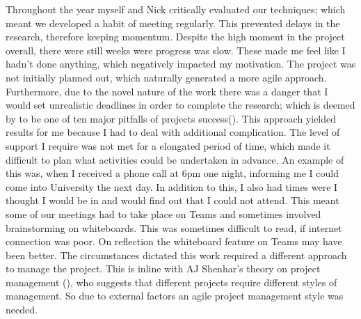 
Throughout the year myself and Nick critically evaluated our techniques; which meant we developed a habit of meeting regularly. This prevented delays in the research, therefore keeping momentum. Despite the high moment in the project overall, there were still weeks were progress was slow. These made me feel like I hadn't done anything, which negatively impacted my motivation. The project was not initially planned out, which naturally generated a more agile approach. Furthermore, due to the novel nature of the work there was a danger that I would set unrealistic deadlines in order to complete the research; which is deemed by \citeauthor{GanttPRO} to be one of ten major pitfalls of projects success(\cite{GanttPRO}). This approach yielded results for me because I had to deal with additional complication. The level of support I require was not met for a elongated period of time, which made it difficult to plan what activities could be undertaken in advance. An example of this was, when I received a phone call at 6pm one night, informing me I could come into University the next day. In addition to this, I also had times were I thought I would be in and would find out that I could not attend. This meant some of our meetings had to take place on Teams and sometimes involved brainstorming on whiteboards. This was sometimes difficult to read, if internet connection was poor. On reflection the whiteboard feature on Teams may have been better. The circumstances dictated this work required a different approach to manage the project. This is inline with AJ Shenhar's theory on project management (\cite{Shenhar1}), who suggests that different projects require different styles of management. So due to external factors an agile project management style was needed.

